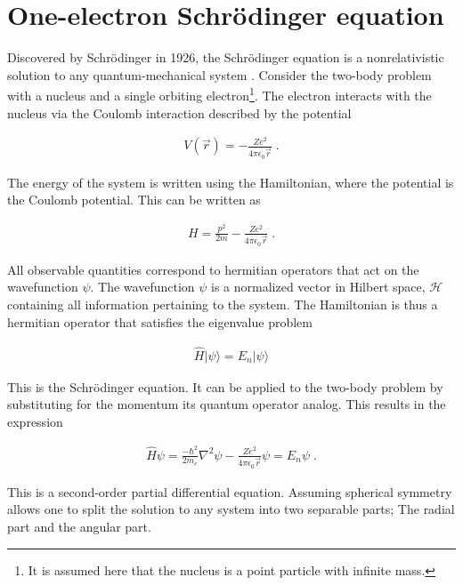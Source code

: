     \section{One-electron Schrödinger equation} \label{sec:Schrodinger_Equation}
        Discovered by Schrödinger in 1926, the Schrödinger equation is a nonrelativistic solution to any quantum-mechanical system \cite{Schrödinger_1926}. Consider the two-body problem with a nucleus and a single orbiting electron\footnote{It is assumed here that the nucleus is a point particle with infinite mass.}. The electron interacts with the nucleus via the Coulomb interaction described by the potential

        \begin{align}
            V(\vec{r}) = -\frac{Z e^2}{4\pi \epsilon_0 \vec{r}}\;.
        \end{align}

        \noindent The energy of the system is written using the Hamiltonian, where the potential is the Coulomb potential. This can be written as

        \begin{align}
            H = \frac{p^2}{2m} -\frac{Z e^2}{4\pi \epsilon_0 \vec{r}}\;.
        \end{align}

        \noindent All observable quantities correspond to hermitian operators that act on the wavefunction $\psi$. The wavefunction $\psi$ is a normalized vector in Hilbert space, $\mathcal{H}$ containing all information pertaining to the system. The Hamiltonian is thus a hermitian operator that satisfies the eigenvalue problem 

        \begin{align}
            \hat{H} \vert\psi \rangle = E_n \vert \psi \rangle
        \end{align}

        \noindent This is the Schrödinger equation. It can be applied to the two-body problem by substituting for the momentum its quantum operator analog. This results in the expression 

        \begin{align}
            \hat{H} \psi  = \frac{-\hbar^2}{2m_e} \nabla^2 \psi -\frac{Z e^2}{4\pi \epsilon_0 \vec{r}} \psi = E_n \psi \;.
        \end{align}

        \noindent This is a second-order partial differential equation. Assuming spherical symmetry allows one to split the solution to any system into two separable parts; The radial part and the angular part.

